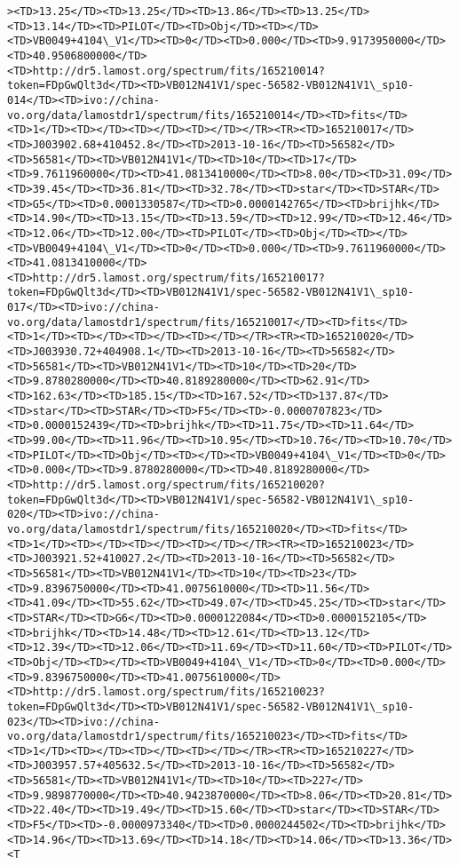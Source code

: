 \documentclass[11pt]{article}
\begin{document}
\begin{Verbatim}[commandchars=\\\{\}]
><TD>13.25</TD><TD>13.25</TD><TD>13.86</TD><TD>13.25</TD><TD>13.14</TD><TD>PILOT</TD><TD>Obj</TD><TD></TD><TD>VB0049+4104\_V1</TD><TD>0</TD><TD>0.000</TD><TD>9.9173950000</TD><TD>40.9506800000</TD><TD>http://dr5.lamost.org/spectrum/fits/165210014?token=FDpGwQlt3d</TD><TD>VB012N41V1/spec-56582-VB012N41V1\_sp10-014</TD><TD>ivo://china-vo.org/data/lamostdr1/spectrum/fits/165210014</TD><TD>fits</TD><TD>1</TD><TD></TD><TD></TD><TD></TD></TR><TR><TD>165210017</TD><TD>J003902.68+410452.8</TD><TD>2013-10-16</TD><TD>56582</TD><TD>56581</TD><TD>VB012N41V1</TD><TD>10</TD><TD>17</TD><TD>9.7611960000</TD><TD>41.0813410000</TD><TD>8.00</TD><TD>31.09</TD><TD>39.45</TD><TD>36.81</TD><TD>32.78</TD><TD>star</TD><TD>STAR</TD><TD>G5</TD><TD>0.0001330587</TD><TD>0.0000142765</TD><TD>brijhk</TD><TD>14.90</TD><TD>13.15</TD><TD>13.59</TD><TD>12.99</TD><TD>12.46</TD><TD>12.06</TD><TD>12.00</TD><TD>PILOT</TD><TD>Obj</TD><TD></TD><TD>VB0049+4104\_V1</TD><TD>0</TD><TD>0.000</TD><TD>9.7611960000</TD><TD>41.0813410000</TD><TD>http://dr5.lamost.org/spectrum/fits/165210017?token=FDpGwQlt3d</TD><TD>VB012N41V1/spec-56582-VB012N41V1\_sp10-017</TD><TD>ivo://china-vo.org/data/lamostdr1/spectrum/fits/165210017</TD><TD>fits</TD><TD>1</TD><TD></TD><TD></TD><TD></TD></TR><TR><TD>165210020</TD><TD>J003930.72+404908.1</TD><TD>2013-10-16</TD><TD>56582</TD><TD>56581</TD><TD>VB012N41V1</TD><TD>10</TD><TD>20</TD><TD>9.8780280000</TD><TD>40.8189280000</TD><TD>62.91</TD><TD>162.63</TD><TD>185.15</TD><TD>167.52</TD><TD>137.87</TD><TD>star</TD><TD>STAR</TD><TD>F5</TD><TD>-0.0000707823</TD><TD>0.0000152439</TD><TD>brijhk</TD><TD>11.75</TD><TD>11.64</TD><TD>99.00</TD><TD>11.96</TD><TD>10.95</TD><TD>10.76</TD><TD>10.70</TD><TD>PILOT</TD><TD>Obj</TD><TD></TD><TD>VB0049+4104\_V1</TD><TD>0</TD><TD>0.000</TD><TD>9.8780280000</TD><TD>40.8189280000</TD><TD>http://dr5.lamost.org/spectrum/fits/165210020?token=FDpGwQlt3d</TD><TD>VB012N41V1/spec-56582-VB012N41V1\_sp10-020</TD><TD>ivo://china-vo.org/data/lamostdr1/spectrum/fits/165210020</TD><TD>fits</TD><TD>1</TD><TD></TD><TD></TD><TD></TD></TR><TR><TD>165210023</TD><TD>J003921.52+410027.2</TD><TD>2013-10-16</TD><TD>56582</TD><TD>56581</TD><TD>VB012N41V1</TD><TD>10</TD><TD>23</TD><TD>9.8396750000</TD><TD>41.0075610000</TD><TD>11.56</TD><TD>41.09</TD><TD>55.62</TD><TD>49.07</TD><TD>45.25</TD><TD>star</TD><TD>STAR</TD><TD>G6</TD><TD>0.0000122084</TD><TD>0.0000152105</TD><TD>brijhk</TD><TD>14.48</TD><TD>12.61</TD><TD>13.12</TD><TD>12.39</TD><TD>12.06</TD><TD>11.69</TD><TD>11.60</TD><TD>PILOT</TD><TD>Obj</TD><TD></TD><TD>VB0049+4104\_V1</TD><TD>0</TD><TD>0.000</TD><TD>9.8396750000</TD><TD>41.0075610000</TD><TD>http://dr5.lamost.org/spectrum/fits/165210023?token=FDpGwQlt3d</TD><TD>VB012N41V1/spec-56582-VB012N41V1\_sp10-023</TD><TD>ivo://china-vo.org/data/lamostdr1/spectrum/fits/165210023</TD><TD>fits</TD><TD>1</TD><TD></TD><TD></TD><TD></TD></TR><TR><TD>165210227</TD><TD>J003957.57+405632.5</TD><TD>2013-10-16</TD><TD>56582</TD><TD>56581</TD><TD>VB012N41V1</TD><TD>10</TD><TD>227</TD><TD>9.9898770000</TD><TD>40.9423870000</TD><TD>8.06</TD><TD>20.81</TD><TD>22.40</TD><TD>19.49</TD><TD>15.60</TD><TD>star</TD><TD>STAR</TD><TD>F5</TD><TD>-0.0000973340</TD><TD>0.0000244502</TD><TD>brijhk</TD><TD>14.96</TD><TD>13.69</TD><TD>14.18</TD><TD>14.06</TD><TD>13.36</TD><T
\end{Verbatim}
\end{document}
